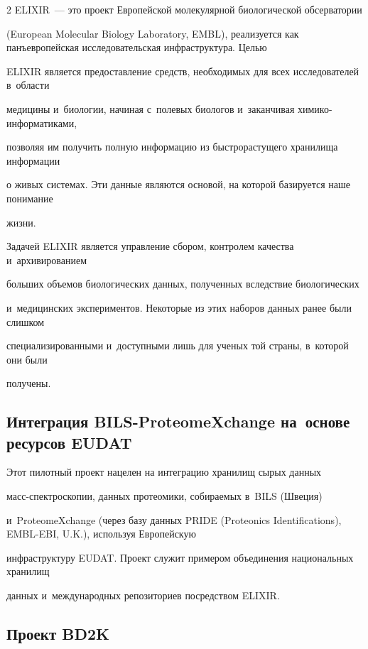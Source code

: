 \begin{multicols}{2}
  ELIXIR~--- это проект Европейской молекулярной биологической обсерватории 


(European Molecular Biology Laboratory, EMBL), реализуется как панъевропейская исследовательская инфраструктура. Целью 


ELIXIR является пред\-остав\-ле\-ние средств, необходимых для всех исследователей в~области 


медицины и~биологии, начиная с~полевых биологов и~заканчивая хи\-ми\-ко-ин\-фор\-ма\-ти\-ка\-ми, 


позволяя им получить полную информацию из быстрорастущего хранилища информации 


о живых системах. Эти данные являются основой, на которой базируется наше понимание 


жизни. 


  


  Задачей ELIXIR является управление сбором, контролем качества и~архивированием 


больших объемов биологических данных, полученных вследствие биологических 


и~медицинских экспериментов. Некоторые из этих наборов данных ранее были слишком 


специализированными и~доступными лишь для ученых той страны, в~которой они были 


получены.





\subsection{Интеграция BILS-ProteomeXchange на~основе ресурсов EUDAT}


 


  Этот пилотный проект нацелен на интеграцию хранилищ сырых данных  


масс-спектроскопии, данных протеомики, собираемых в~BILS (Швеция) 


и~ProteomeXchange (через базу данных PRIDE (Proteonics Identifications), EMBL-EBI, U.K.), используя Европейскую 


инфраструктуру EUDAT. Проект служит примером объединения национальных хранилищ 


данных и~международных репозиториев посредством ELIXIR.


  


\subsection{Проект BD2K}






\end{multicols}
